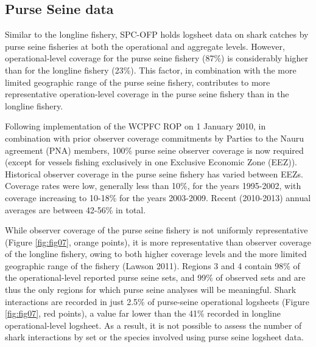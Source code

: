 \documentclass[12pt]{SCreport}
\begin{document}

\clearpage
 
 
 \subsection{Purse Seine data} 
Similar to the longline fishery, SPC-OFP holds logsheet data on shark catches by purse seine fisheries at both the operational and aggregate levels.  However, operational-level coverage for the purse seine fishery (87\%) is considerably higher than for the longline fishery (23\%). This factor, in combination with the more limited geographic range of the purse seine fishery, contributes to more representative operation-level coverage in the purse seine fishery than in the longline fishery.

Following implementation of the WCPFC ROP on 1 January 2010, in combination with prior observer coverage commitments by Parties to the Nauru agreement (PNA) members, 100\% purse seine observer coverage is now required (except for vessels fishing exclusively in one Exclusive Economic Zone (EEZ)). Historical observer coverage in the purse seine fishery has varied between EEZs. Coverage rates were low, generally less than 10\%, for the years 1995-2002, with coverage increasing to 10-18\% for the years 2003-2009. Recent (2010-2013) annual averages are between 42-56\% in total.


While observer coverage of the purse seine fishery is not uniformly representative (Figure \ref{fig:fig07}, orange points), it is more representative than observer coverage of the longline fishery, owing to both higher coverage levels and the more limited geographic range of the fishery (Lawson 2011). Regions 3 and 4 contain 98\% of the operational-level reported purse seine sets, and 99\% of observed sets and are thus the only regions for which purse seine analyses will be meaningful. Shark interactions are recorded in just 2.5\% of purse-seine operational logsheets (Figure \ref{fig:fig07}, red points), a value far lower than the 41\% recorded in longline operational-level logsheet. As a result, it is not possible to assess the number of shark interactions by set or the species involved using purse seine logsheet data.
\end{document}
